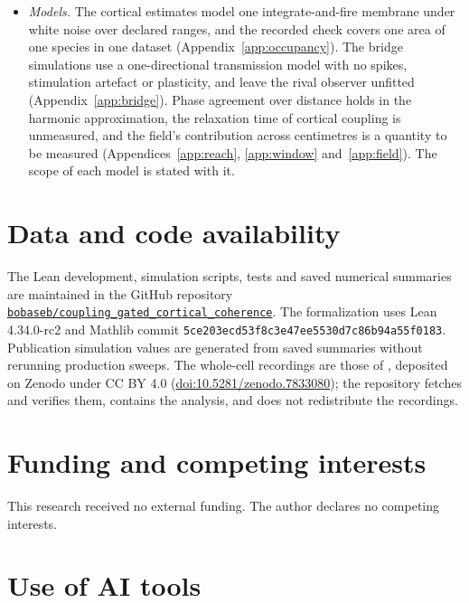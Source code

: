 \documentclass[12pt]{article}
\begin{document}
\begin{itemize}
\item \emph{Models.} The cortical estimates model one integrate-and-fire
membrane under white noise over declared ranges, and the recorded check covers
one area of one species in one dataset (Appendix~\ref{app:occupancy}). The
bridge simulations use a one-directional transmission model with no spikes,
stimulation artefact or plasticity, and leave the rival observer unfitted
(Appendix~\ref{app:bridge}). Phase agreement over distance holds in the harmonic
approximation, the relaxation time of cortical coupling is unmeasured, and the
field's contribution across centimetres is a quantity to be measured
(Appendices~\ref{app:reach}, \ref{app:window} and~\ref{app:field}). The scope of
each model is stated with it.

\end{itemize}

\section*{Data and code availability}

The Lean development, simulation scripts, tests and saved numerical summaries
are maintained in the GitHub repository
\href{https://github.com/bobaseb/coupling_gated_cortical_coherence}{\nolinkurl{bobaseb/coupling_gated_cortical_coherence}}.
The formalization uses Lean 4.34.0-rc2 and Mathlib commit
\texttt{5ce203ecd53f8c3e47ee5530d7c86b94a55f0183}. Publication simulation
values are generated from saved summaries without rerunning production sweeps.
The whole-cell recordings are those of \citet{kiritani2023}, deposited on
Zenodo under CC BY 4.0
(\href{https://doi.org/10.5281/zenodo.7833080}{doi:10.5281/zenodo.7833080});
the repository fetches and verifies them, contains the analysis, and does not
redistribute the recordings.

\section*{Funding and competing interests}

This research received no external funding. The author declares no competing
interests.

\section*{Use of AI tools}
\end{document}
